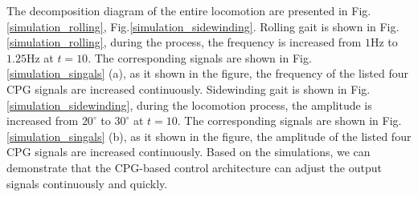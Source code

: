 \documentclass[letterpaper, 10 pt, conference]{ieeeconf}
\begin{document}


The decomposition diagram of the entire locomotion are presented in
Fig.\ref{simulation_rolling}, Fig.\ref{simulation_sidewinding}. Rolling gait
is shown in Fig.\ref{simulation_rolling}, during the process, the frequency
is increased from $1$Hz to $1.25$Hz at $t=10$. The corresponding signals are
shown in Fig. \ref{simulation_singals} (a), as it shown in the figure, the
frequency of the listed four CPG signals are increased continuously.
Sidewinding gait is shown in Fig.\ref{simulation_sidewinding}, during the
locomotion process, the amplitude is increased from $20^{\circ}$ to
$30^{\circ}$ at $t=10$. The corresponding signals are shown in Fig.
\ref{simulation_singals} (b), as it shown in the figure, the amplitude of
the listed four CPG signals are increased continuously. Based on the
simulations, we can demonstrate that the CPG-based control architecture can
adjust the output signals continuously and quickly.

\end{document}
